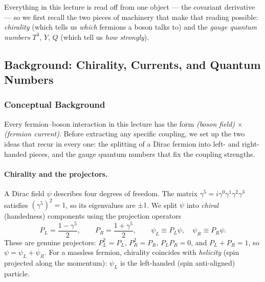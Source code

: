 Everything in this lecture is read off from one object --- the
covariant derivative --- so we first recall the two pieces of machinery
that make that reading possible: \emph{chirality} (which tells us
\emph{which} fermions a boson talks to) and the \emph{gauge quantum
numbers} $T^3$, $Y$, $Q$ (which tell us \emph{how strongly}).

\subsection{Background: Chirality, Currents, and Quantum Numbers}\label{subsec:lec19:background}

\subsubsection*{Conceptual Background}

Every fermion--boson interaction in this lecture has the form
\emph{(boson field)} $\times$ \emph{(fermion current)}. Before extracting
any specific coupling, we set up the two ideas that recur in every one:
the splitting of a Dirac fermion into left- and right-handed pieces,
and the gauge quantum numbers that fix the coupling strengths.

\paragraph{Chirality and the projectors.}
A Dirac field $\psi$ describes four degrees of freedom. The matrix
$\gamma^5 = i\gamma^0\gamma^1\gamma^2\gamma^3$ satisfies
$(\gamma^5)^2 = 1$, so its eigenvalues are $\pm1$. We split $\psi$ into
\emph{chiral} (handedness) components using the projection operators
\begin{equation}
  P_L = \frac{1-\gamma^5}{2},\qquad
  P_R = \frac{1+\gamma^5}{2},\qquad
  \psi_L \equiv P_L\psi,\quad \psi_R \equiv P_R\psi.
  \label{eq:lec19:projectors}
\end{equation}
These are genuine projectors: $P_L^2 = P_L$, $P_R^2 = P_R$,
$P_LP_R = 0$, and $P_L + P_R = 1$, so $\psi = \psi_L + \psi_R$. For a
massless fermion, chirality coincides with \emph{helicity} (spin
projected along the momentum): $\psi_L$ is the left-handed (spin
anti-aligned) particle.

